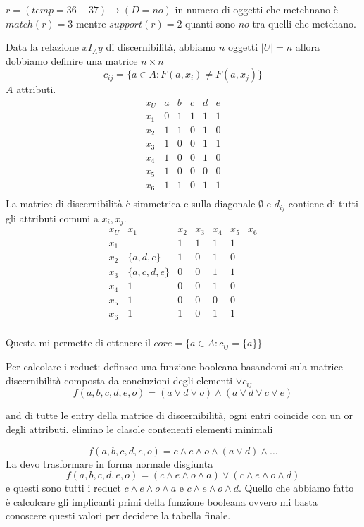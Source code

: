 $r=(temp = 36-37)\to (D=no)$ in numero di oggetti che metchnano è $match(r)=3$ 
mentre $support(r)= 2$ quanti sono $no$ tra quelli che metchano.


\begin{esempio}
    Data la relazione $xI_Ay$ di discernibilità, abbiamo $n$ oggetti $|U|=n$ allora 
    dobbiamo definire una matrice $n\times n$ 
    $$c_{ij}= \{a\in A: F(a,x_i)\ne F(a,x_j)\}$$
    $A$ attributi.
$$
    \begin{array}{cccccc}
        x_U & a&b&c&d&e\\
        x_1 & 0&1&1&1&1\\
        x_2 & 1&1&0&1&0\\
        x_3 & 1&0&0&1&1\\
        x_4 & 1&0&0&1&0\\
        x_5 & 1&0&0&0&0\\
        x_6 &1&1&0&1&1\\
    \end{array}
    $$  
    La matrice di discernibilità è simmetrica e sulla diagonale $\emptyset$ e 
    $d_{ij}$ contiene di tutti gli attributi comuni a $x_i,x_j$.   
    $$
    \begin{array}{ccccccc}
        x_U & x_1 & x_2 & x_3 & x_4 & x_5 & x_6 \\
        x_1 & &1&1&1&1\\
        x_2 & \{a,d,e\}&1&0&1&0\\
        x_3 & \{a,c,d,e\}&0&0&1&1\\
        x_4 & 1&0&0&1&0\\
        x_5 & 1&0&0&0&0\\
        x_6 &1&1&0&1&1\\
    \end{array}
    $$

    Questa mi permette di ottenere il $core=\{a\in A: c_{ij}= \{a\}\}$

    Per calcolare i reduct: definsco una funzione booleana basandomi sula matrice 
    discernibilità composta da conciuzioni degli elementi $\lor c_{ij}$ 
    $$f(a,b,c,d,e,o)=(a\lor d\lor o)\land (a\lor d\lor c\lor e)$$

    and di tutte le entry della matrice di discernibilità, ogni entri coincide con un 
    or degli attributi. elimino le clasole contenenti elementi minimali

    $$f(a,b,c,d,e,o)= c\land e\land o \land (a\lor d)\land \dots$$
    La devo trasformare in forma normale disgiunta
    $$f(a,b,c,d,e,o)= (c\land e\land o \land a)\lor(c\land e\land o \land d)$$
    e questi sono tutti i reduct $c\land e\land o \land a$ e $c\land e\land o \land d$.
    Quello che abbiamo fatto è calcolcare gli implicanti primi della funzione booleana
    ovvero mi basta conoscere questi valori per decidere la tabella finale.
\end{esempio}

